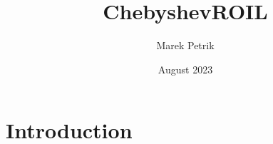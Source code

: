 \documentclass{article}
\title{ChebyshevROIL}
\author{Marek Petrik}
\date{August 2023}
\begin{document}
\maketitle

\section{Introduction}
\end{document}
